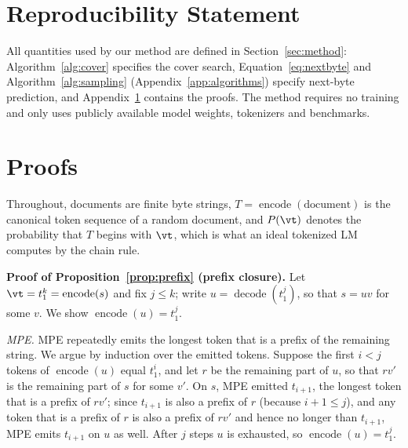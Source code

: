 \documentclass{article} %
\newcommand{\enc}{\operatorname{encode}}
\newcommand{\dec}{\operatorname{decode}}
\begin{document}
\section*{Reproducibility Statement}
All quantities used by our method are defined in Section~\ref{sec:method}: Algorithm~\ref{alg:cover} specifies the cover search, Equation~\ref{eq:nextbyte} and Algorithm~\ref{alg:sampling} (Appendix~\ref{app:algorithms}) specify next-byte prediction, and Appendix~\ref{app:proofs} contains the proofs. The method requires no training and only uses publicly available model weights, tokenizers and benchmarks.




\appendix
\section{Proofs}
\label{app:proofs}

Throughout, documents are finite byte strings, $T=\enc(\text{document})$ is the canonical token sequence of a random document, and $P(\vt)$ denotes the probability that $T$ begins with $\vt$, which is what an ideal tokenized LM computes by the chain rule.

\textbf{Proof of Proposition~\ref{prop:prefix} (prefix closure).}
Let $\vt=t_1^k=\enc(s)$ and fix $j\leq k$; write $u=\dec(t_1^j)$, so that $s=uv$ for some $v$. We show $\enc(u)=t_1^j$.

\emph{MPE.} MPE repeatedly emits the longest token that is a prefix of the remaining string. We argue by induction over the emitted tokens. Suppose the first $i<j$ tokens of $\enc(u)$ equal $t_1^i$, and let $r$ be the remaining part of $u$, so that $r v'$ is the remaining part of $s$ for some $v'$. On $s$, MPE emitted $t_{i+1}$, the longest token that is a prefix of $rv'$; since $t_{i+1}$ is also a prefix of $r$ (because $i+1\leq j$), and any token that is a prefix of $r$ is also a prefix of $rv'$ and hence no longer than $t_{i+1}$, MPE emits $t_{i+1}$ on $u$ as well. After $j$ steps $u$ is exhausted, so $\enc(u)=t_1^j$.
\end{document}
